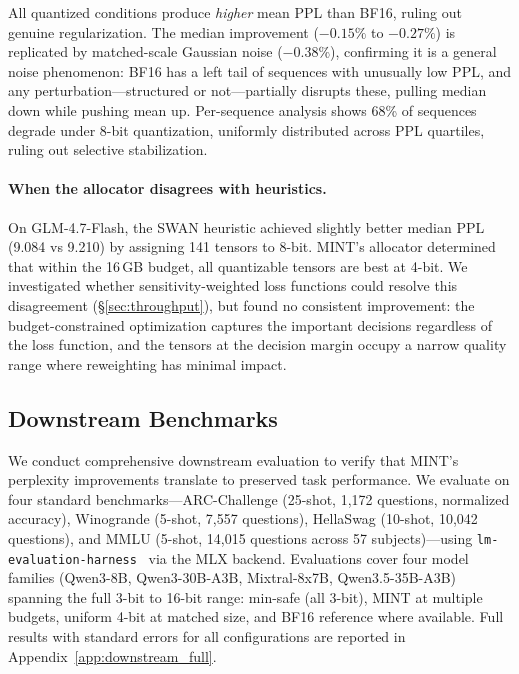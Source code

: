 \documentclass{article}
\begin{document}
All quantized conditions produce \emph{higher} mean PPL than BF16, ruling out genuine regularization. The median improvement ($-0.15\%$ to $-0.27\%$) is replicated by matched-scale Gaussian noise ($-0.38\%$), confirming it is a general noise phenomenon: BF16 has a left tail of sequences with unusually low PPL, and any perturbation---structured or not---partially disrupts these, pulling median down while pushing mean up. Per-sequence analysis shows 68\% of sequences degrade under 8-bit quantization, uniformly distributed across PPL quartiles, ruling out selective stabilization.

\paragraph{When the allocator disagrees with heuristics.}
On GLM-4.7-Flash, the SWAN heuristic achieved slightly better median PPL (9.084 vs 9.210) by assigning 141 tensors to 8-bit. MINT's allocator determined that within the 16\,GB budget, all quantizable tensors are best at 4-bit. We investigated whether sensitivity-weighted loss functions could resolve this disagreement (\S\ref{sec:throughput}), but found no consistent improvement: the budget-constrained optimization captures the important decisions regardless of the loss function, and the tensors at the decision margin occupy a narrow quality range where reweighting has minimal impact.

\subsection{Downstream Benchmarks}
\label{sec:downstream_benchmarks}

We conduct comprehensive downstream evaluation to verify that MINT's perplexity improvements translate to preserved task performance. We evaluate on four standard benchmarks---ARC-Challenge (25-shot, 1{,}172 questions, normalized accuracy), Winogrande (5-shot, 7{,}557 questions), HellaSwag (10-shot, 10{,}042 questions), and MMLU (5-shot, 14{,}015 questions across 57 subjects)---using \texttt{lm-evaluation-harness}~\cite{eval-harness} via the MLX backend. Evaluations cover four model families (Qwen3-8B, Qwen3-30B-A3B, Mixtral-8x7B, Qwen3.5-35B-A3B) spanning the full 3-bit to 16-bit range: min-safe (all 3-bit), MINT at multiple budgets, uniform 4-bit at matched size, and BF16 reference where available. Full results with standard errors for all configurations are reported in Appendix~\ref{app:downstream_full}.
\end{document}
